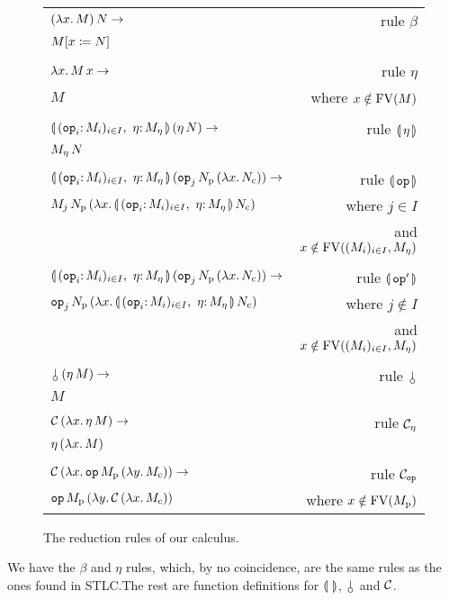\documentclass{llncs}
\begin{document}
\begin{figure}
  \centering
  \begin{tabular}{lr}
  $(\lambda x.\, M)\,N \to$ & rule $\beta$ \\
  $M[x \coloneqq N]$ & \\
  \\
  $\lambda x.\, M\,x \to$ & rule $\eta$ \\
  $M$ & where $x \notin \operatorname{FV}(M)$ \\
  \\
  $\ap{\cibanana}{(\ap{\eta}{N})} \to$ & rule $\llparenthesis \, \eta \, \rrparenthesis$ \\
  $M_\eta\,N$ & \\
  \\
  $\ap{\cibanana}{(\ap{\ap{\op{op}_j}{N_{\mathrm{p}}}}{(\lam{x}{N_{\mathrm{c}}})})} \to$ & rule $\llparenthesis \, \mathtt{op} \, \rrparenthesis$ \\
  $\ap{M_j}{\ap{N_{\mathrm{p}}}{(\lam{x}{\ap{\cibanana}{N_{\mathrm{c}}}})}}$
  & where $j \in I$ \\
  & and $x \notin \operatorname{FV}((M_i)_{i \in I}, M_\eta)$ \\
  \\
  $\ap{\cibanana}{(\ap{\ap{\op{op}_j}{N_{\mathrm{p}}}}{(\lam{x}{N_{\mathrm{c}}})})} \to$ & rule $\llparenthesis \, \mathtt{op}' \, \rrparenthesis$ \\
  $\ap{\op{op}_j}{\ap{N_{\mathrm{p}}}{(\lam{x}{\ap{\cibanana}{N_{\mathrm{c}}}})}}$
  & where $j \notin I$ \\
  & and $x \notin \operatorname{FV}((M_i)_{i \in I}, M_\eta)$ \\
  \\
  $\ap{\cherry}{(\ap{\eta}{M})} \to$ & rule $\cherry$ \\
  $M$ & \\
  \\
  $\mathcal{C}\,(\lambda x.\, \eta\,M) \to$ & rule $\mathcal{C}_\eta$ \\
  $\eta\,(\lambda x.\, M)$ & \\
  \\
  $\mathcal{C}\,(\lambda x.\, \mathtt{op}\,M_{\mathrm{p}}\,(\lambda y.\, M_{\mathrm{c}})) \to$ & rule $\mathcal{C}_{\mathtt{op}}$ \\
  $\mathtt{op}\,M_{\mathrm{p}}\,(\lambda y.\, \mathcal{C}\,(\lambda x.\, M_{\mathrm{c}}))$
  & where $x \notin \operatorname{FV}(M_{\mathrm{p}})$
  \end{tabular}
  
  \caption{\label{fig:reductions} The reduction rules of our calculus.}
\end{figure}

We have the $\beta$ and $\eta$ rules, which, by no coincidence, are the
same rules as the ones found in STLC.\@ The rest are function definitions
for $\llparenthesis \,  \, \rrparenthesis$, $\cherry$ and $\mathcal{C}$.
\end{document}
